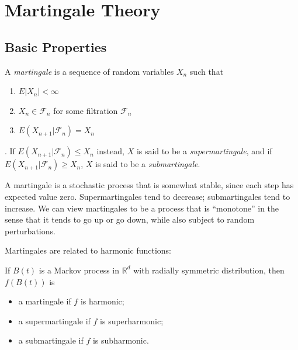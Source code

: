 
\section{Martingale Theory}

\subsection{Basic Properties}

\begin{definition}[Martingale]
	\label{defn:martingale}
	A \textit{martingale} is a sequence of random variables $X_n$ such that
	\begin{enumerate}
		\item $E|X_n| < \infty $ 
		\item $X_n \in \mathcal{F}_n$ for some filtration $\mathcal{F}_n$
		\item $E(X_{n+1} | \mathcal{F}_n) = X_n$
	\end{enumerate}.
	If $E(X_{n+1}|\mathcal{F}_n) \le X_n$ instead, $X$ is said to be a \textit{supermartingale}, and if $E(X_{n+1}|\mathcal{F}_n) \ge X_n$, $X$ is said to be a  \textit{submartingale}.
\end{definition}
\begin{intuition}
	A martingale is a stochastic process that is somewhat stable, since each step has expected value zero. Supermartingales tend to decrease; submartingales tend to increase. We can view martingales to be a process that is ``monotone'' in the sense that it tends to go up or go down, while also subject to random perturbations.
\end{intuition}

Martingales are related to harmonic functions:
\begin{proposition}
	\label{prop:martingaleHarmonic}
	If $B(t)$ is a Markov process in $\mathbb{R}^d$ with radially symmetric distribution, then $f(B(t))$ is
	\begin{itemize}
		\item a martingale if $f$ is harmonic;
		\item a supermartingale if $f$ is superharmonic;
		\item a submartingale if $f$ is subharmonic.
	\end{itemize}
\end{proposition}

